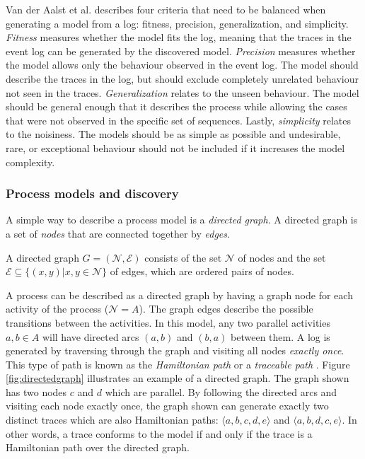 Van der Aalst et al. \cite{van2013discovering} describes four criteria that need to be balanced when generating a model from a log: fitness, precision, generalization, and simplicity.
\emph{Fitness} measures whether the model fits the log, meaning that the traces in the event log can be generated by the discovered model.
\emph{Precision} measures whether the model allows only the behaviour observed in the event log. The model should describe the traces in the log, but should exclude completely unrelated behaviour not seen in the traces.
\emph{Generalization} relates to the unseen behaviour. The model should be general enough that it describes the process while allowing the cases that were not observed in the specific set of sequences.
Lastly, \emph{simplicity} relates to the noisiness. The models should be as simple as possible and undesirable, rare, or exceptional behaviour should not be included if it increases the model complexity.


\subsubsection{Process models and discovery}
\label{sec:processmodelsdsc}

A simple way to describe a process model is a \emph{directed graph}. A directed graph is a set of \emph{nodes} that are connected together by \emph{edges}. 

\begin{definition}
A directed graph $G = (\mathcal{N}, \mathcal{E})$ consists of the set $\mathcal{N}$ of nodes and the set $\mathcal{E} \subseteq \{ (x,y) | x,y \in \mathcal{N} \} $ of edges, which are ordered pairs of nodes.
\end{definition}

A process can be described as a directed graph by having a graph node for each activity of the process ($\mathcal{N} = A$). The graph edges describe the possible transitions between the activities.
In this model, any two parallel activities $a, b \in A$ will have directed arcs $(a,b)$ and $(b,a)$ between them.
A log is generated by traversing through the graph and visiting all nodes \textit{exactly once}.
This type of path is known as the \textit{Hamiltonian path} or a \textit{traceable path} \cite{garey1979computers}.
Figure \ref{fig:directedgraph} illustrates an example of a directed graph.
The graph shown has two nodes $c$ and $d$ which are parallel.
By following the directed arcs and visiting each node exactly once, the graph shown can generate exactly two distinct traces which are also Hamiltonian paths: $\langle a,b,c,d,e \rangle$ and $\langle a,b,d,c,e \rangle$.
In other words, a trace conforms to the model if and only if the trace is a Hamiltonian path over the directed graph.

